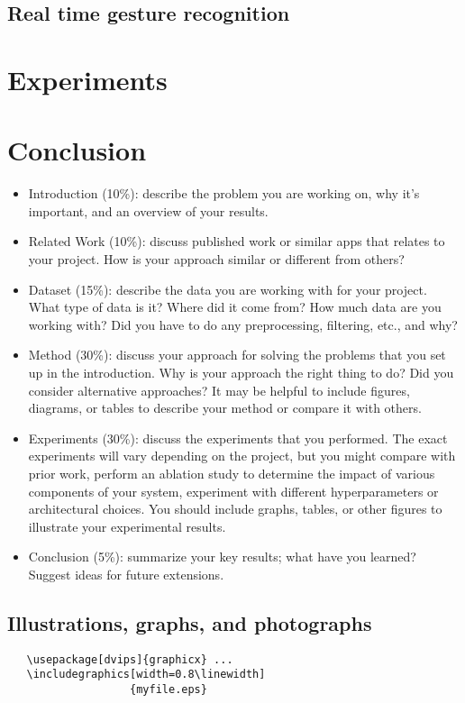 \documentclass[10pt,twocolumn,letterpaper]{article}
\begin{document}
\subsection{Real time gesture recognition}

\section{Experiments}

\section{Conclusion}



\begin{itemize}
	\item Introduction (10\%): describe the problem you are working on, why it's important, and an overview of your results.
	\item Related Work (10\%): discuss published work or similar apps that relates to your project. How is your approach similar or different from others?
	\item Dataset (15\%): describe the data you are working with for your project. What type of data is it? Where did it come from? How much data are you working with? Did you have to do any preprocessing, filtering, etc., and why?
	\item Method (30\%): discuss your approach for solving the problems that you set up in the introduction. Why is your approach the right thing to do? Did you consider alternative approaches? It may be helpful to include figures, diagrams, or tables to describe your method or compare it with others.
	\item Experiments (30\%): discuss the experiments that you performed. The exact experiments will vary depending on the project, but you might compare with prior work, perform an ablation study to determine the impact of various components of your system, experiment with different hyperparameters or architectural choices. You should include graphs, tables, or other figures to illustrate your experimental results.
	\item Conclusion (5\%): summarize your key results; what have you learned? Suggest ideas for future extensions.
\end{itemize}	






\subsection{Illustrations, graphs, and photographs}

{\small\begin{verbatim}
   \usepackage[dvips]{graphicx} ...
   \includegraphics[width=0.8\linewidth]
                   {myfile.eps}
\end{verbatim}
}


{\small


}
\end{document}
